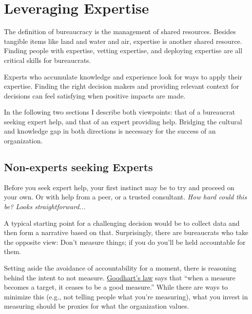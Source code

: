 \section{Leveraging Expertise\label{sec:expertise}}



The definition of \gls{bureaucracy} is the management of shared resources. Besides tangible items like land and water and air, expertise is another shared resource. Finding people with expertise, vetting expertise, and deploying expertise are all critical skills for bureaucrats. 

Experts who accumulate knowledge and experience look for ways to apply their expertise. Finding the right decision makers and providing relevant context for decisions can feel satisfying when positive impacts are made. 


In the following two sections I describe both viewpoints: that of a bureaucrat seeking expert help, and that of an expert providing help. Bridging the cultural and knowledge gap in both directions is necessary for the success of an organization.

\subsection*{Non-experts seeking Experts}

Before you seek expert help, your first instinct may be to try and proceed on your own. Or with help from a peer, or a trusted consultant. \textit{How hard could this be? Looks straightforward...}

A typical starting point for a challenging decision would be to collect data and then form a narrative based on that. Surprisingly, there are bureaucrats who take the opposite view: Don't measure things; if you do you'll be held accountable for them. 

Setting aside the avoidance of accountability for a moment, there is reasoning behind the intent to not measure.  \href{https://en.wikipedia.org/wiki/Goodhart\%27s_law}{Goodhart's law}
says that ``when a measure becomes a target, it ceases to be a good measure.'' While there are ways to minimize this (e.g., not telling people what you're measuring), what you invest in measuring should be proxies for what the organization values.

